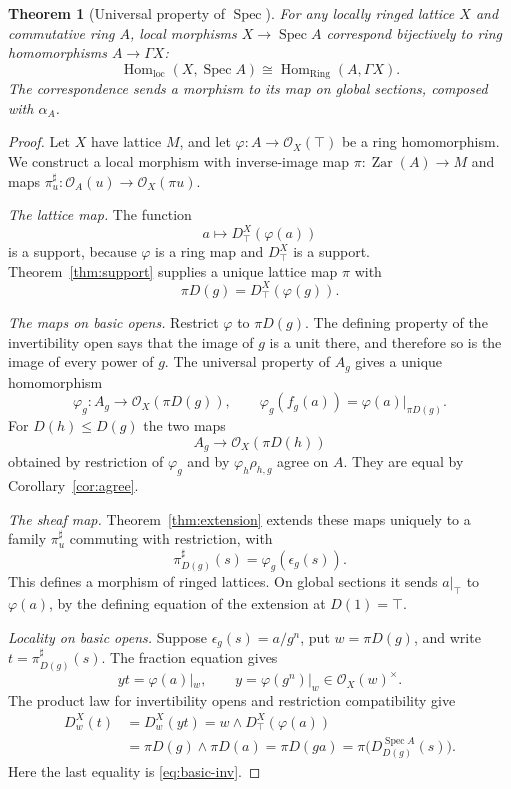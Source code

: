 \documentclass[11pt]{amsart}
\newtheorem{theorem}{Theorem}[section]
\theoremstyle{definition}
\theoremstyle{remark}
\newcommand{\Zar}{\operatorname{Zar}}
\newcommand{\Spec}{\operatorname{Spec}}
\newcommand{\Hom}{\operatorname{Hom}}
\newcommand{\OO}{\mathcal O}
\newcommand{\units}[1]{#1^{\times}}
\newcommand{\restr}[2]{#1|_{#2}}
\begin{document}
\begin{theorem}[Universal property of $\Spec$]\label{thm:spec-universal}
For any locally ringed lattice $X$ and commutative ring $A$, local
morphisms $X\to\Spec A$ correspond bijectively to ring homomorphisms
$A\to\Gamma X$:
\[
 \Hom_{\mathrm{loc}}(X,\Spec A)
 \cong \Hom_{\mathrm{Ring}}(A,\Gamma X).
\]
The correspondence sends a morphism to its map on global sections,
composed with $\alpha_A$.
\end{theorem}
\begin{proof}
Let $X$ have lattice $M$, and let $\varphi:A\to\OO_X(\top)$ be a ring
homomorphism. We construct a local morphism with inverse-image map
$\pi:\Zar(A)\to M$ and maps
$\pi^\sharp_u:\OO_A(u)\to\OO_X(\pi u)$.

\emph{The lattice map.} The function
\[
 a\longmapsto D^X_\top(\varphi(a))
\]
is a support, because $\varphi$ is a ring map and $D^X_\top$ is a
support. Theorem~\ref{thm:support} supplies a unique lattice map $\pi$
with
\begin{equation}\label{eq:pi-D}
 \pi D(g)=D^X_\top(\varphi(g)).
\end{equation}

\emph{The maps on basic opens.} Restrict $\varphi$ to $\pi D(g)$.
The defining property of the invertibility open says that the image of
$g$ is a unit there, and therefore so is the image of every power of $g$.
The universal property of $A_g$ gives a unique homomorphism
\[
 \varphi_g:A_g\longrightarrow\OO_X(\pi D(g)),\qquad
 \varphi_g(f_g(a))=\restr{\varphi(a)}{\pi D(g)}.
\]
For $D(h)\leq D(g)$ the two maps
\[
 A_g\longrightarrow\OO_X(\pi D(h))
\]
obtained by restriction of $\varphi_g$ and by $\varphi_h\rho_{h,g}$
agree on $A$. They are equal by Corollary~\ref{cor:agree}.

\emph{The sheaf map.} Theorem~\ref{thm:extension} extends these maps
uniquely to a family $\pi^\sharp_u$ commuting with restriction, with
\begin{equation}\label{eq:sharp-basic}
 \pi^\sharp_{D(g)}(s)=\varphi_g(\epsilon_g(s)).
\end{equation}
This defines a morphism of ringed lattices. On global sections it sends
$a|_\top$ to $\varphi(a)$, by the defining equation of the extension at
$D(1)=\top$.

\emph{Locality on basic opens.} Suppose
$\epsilon_g(s)=a/g^n$, put $w=\pi D(g)$, and write
$t=\pi^\sharp_{D(g)}(s)$. The fraction equation gives
\[
 y t=\restr{\varphi(a)}{w},\qquad
 y=\restr{\varphi(g^n)}{w}\in\units{\OO_X(w)}.
\]
The product law for invertibility opens and restriction compatibility
give
\begin{align*}
 D^X_w(t)
 &=D^X_w(yt)
  =w\wedge D^X_\top(\varphi(a))\\
 &=\pi D(g)\wedge\pi D(a)
  =\pi D(ga)
  =\pi\bigl(D^{\Spec A}_{D(g)}(s)\bigr).
\end{align*}
Here the last equality is \eqref{eq:basic-inv}.


\end{proof}
\end{document}
